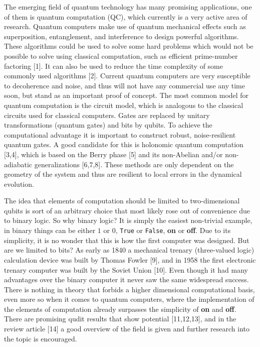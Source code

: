 The emerging field of quantum technology has many promising applications, one of them is quantum computation (QC), which currently is a very active area of research. Quantum computers make use of quantum mechanical effects such as superposition, entanglement, and interference to design powerful algorithms. These algorithms could be used to solve some hard problems which would not be  possible to solve using classical computation, such as efficient prime-number factoring [1]. It can also be used to reduce the time complexity of some commonly used algorithms [2]. Current quantum computers are very susceptible to decoherence and noise, and thus will not have any commercial use any time soon, but stand as an important proof of concept. 
The most common model for quantum computation is the circuit model, which is analogous to the classical circuits used for classical computers. Gates are replaced by unitary transformations (quantum gates) and bits by qubits. To achieve the computational advantage it is important to construct robust, noise-resilient quantum gates. A good candidate for this is holonomic quantum computation [3,4], which is based on the Berry phase [5] and its non-Abelian and/or non-adiabatic generalizations [6,7,8]. These methods are only dependent on the geometry of the system and thus are resilient to local errors in the dynamical evolution.


The idea that elements of computation should be limited to two-dimensional qubits is sort of an arbitrary choice that most likely rose out of convenience due to binary logic. So why binary logic? It is simply the easiest non-trivial example, in binary things can be either $1$ or $0$, {\tt True} or {\tt False}, \textbf{on} or \textbf{off}. Due to its simplicity, it is no wonder that this is how the first computer was designed. But are we limited to bits? As early as 1840 a mechanical trenary (three-valued logic) calculation device was built by Thomas Fowler [9], and in 1958 the first electronic trenary computer was built by the Soviet Union [10]. Even though it had many advantages over the binary computer it never saw the same widespread success. There is nothing in theory that forbids a higher dimensional computational basis, even more so when it comes to quantum computers, where the implementation of the elements of computation already surpasses the simplicity of \textbf{on} and \textbf{off}. There are promising qudit results that show potential [11,12,13], and in the review article [14] a good overview of the field is given and further research into the topic is encouraged.

